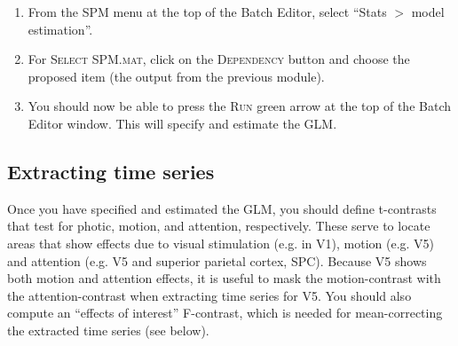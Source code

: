 \begin{enumerate}
 \begin{itemize}
  \item Condition 1: \textsc{Name} = \texttt{Photic}, \textsc{Onsets} = \texttt{[att natt stat]} and \textsc{Durations} = \texttt{10}.
  \item Condition 2: \textsc{Name} = \texttt{Motion}, \textsc{Onsets} = \texttt{[att natt]} and \textsc{Durations} = \texttt{10}.
  \item Condition 3: \textsc{Name} = \texttt{Attention}, \textsc{Onsets} = \texttt{att} and \textsc{Durations} = \texttt{10}.
 \end{itemize}
 \item From the SPM menu at the top of the Batch Editor, select ``Stats $>$ model estimation''.
 \item For \textsc{Select SPM.mat}, click on the \textsc{Dependency} button and choose the proposed item (the output from the previous module).
 \item You should now be able to press the \textsc{Run} green arrow at the top of the Batch Editor window. This will specify and estimate the GLM.
\end{enumerate}

\subsection{Extracting time series}

Once you have specified and estimated the GLM, you should define t-contrasts that test for photic, motion, and attention, respectively. These serve to locate areas that show effects due to visual stimulation (e.g. in V1), motion (e.g. V5) and attention (e.g. V5 and superior parietal cortex, SPC). Because V5 shows both motion and attention effects, it is useful to mask the motion-contrast with the attention-contrast when extracting time series for V5. You should also compute an ``effects of interest'' F-contrast, which is needed for mean-correcting the extracted time series (see below).

